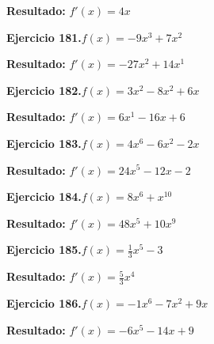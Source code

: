 \documentclass[10pt,a4paper]{article}
\begin{document}
\begin{solbox}
\textbf{Resultado:} \(\displaystyle f'(x) = 4x\)
\end{solbox}

\newpage
\begin{ejbox}
\textbf{Ejercicio 181.}\quad $f(x) = -9x^{3} + 7x^{2}$
\end{ejbox}

\begin{solbox}
\textbf{Resultado:} \(\displaystyle f'(x) = -27x^{2} + 14x^{1}\)
\end{solbox}

\begin{ejbox}
\textbf{Ejercicio 182.}\quad $f(x) = 3x^{2} -8x^2 +6x$
\end{ejbox}

\begin{solbox}
\textbf{Resultado:} \(\displaystyle f'(x) = 6x^{1} -16x +6\)
\end{solbox}

\begin{ejbox}
\textbf{Ejercicio 183.}\quad $f(x) = 4x^{6} -6x^2 -2x$
\end{ejbox}

\begin{solbox}
\textbf{Resultado:} \(\displaystyle f'(x) = 24x^{5} -12x -2\)
\end{solbox}

\newpage
\begin{ejbox}
\textbf{Ejercicio 184.}\quad $f(x) = 8x^{6} + x^{10}$
\end{ejbox}

\begin{solbox}
\textbf{Resultado:} \(\displaystyle f'(x) = 48x^{5} + 10x^{9}\)
\end{solbox}

\begin{ejbox}
\textbf{Ejercicio 185.}\quad $f(x) = \frac{1}{3}x^{5} -3$
\end{ejbox}

\begin{solbox}
\textbf{Resultado:} \(\displaystyle f'(x) = \frac{5}{3}x^{4}\)
\end{solbox}

\begin{ejbox}
\textbf{Ejercicio 186.}\quad $f(x) = -1x^{6} -7x^2 +9x$
\end{ejbox}

\begin{solbox}
\textbf{Resultado:} \(\displaystyle f'(x) = -6x^{5} -14x +9\)
\end{solbox}
\end{document}
